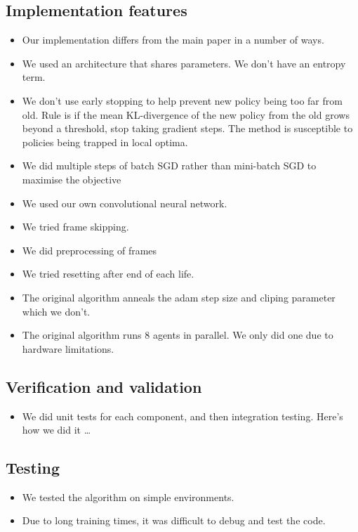 \documentclass[12pt,a4paper]{article}
\begin{document}
\subsection{Implementation features}
\begin{itemize}
    \item Our implementation differs from the main paper in a number of ways.
    \item We used an architecture that shares parameters. We don't have an entropy term.
    \item We don't use early stopping to help prevent new policy being too far from old. Rule is if the mean KL-divergence of the new policy from the old grows beyond a threshold, stop taking gradient steps. The method is susceptible to policies being trapped in local optima.
    \item We did multiple steps of batch SGD rather than mini-batch SGD to maximise the objective
    \item We used our own convolutional neural network.
    \item We tried frame skipping.
    \item We did preprocessing of frames
    \item We tried resetting after end of each life. 
    \item The original algorithm anneals the adam step size and cliping parameter which we don't.
    \item The original algorithm runs 8 agents in parallel. We only did one due to hardware limitations.
\end{itemize}

\subsection{Verification and validation}
\begin{itemize}
    \item We did unit tests for each component, and then integration testing. Here's how we did it \dots
\end{itemize}

\subsection{Testing}
\begin{itemize}
    \item We tested the algorithm on simple environments. 
    \item Due to long training times, it was difficult to debug and test the code. 
\end{itemize}
\end{document}
